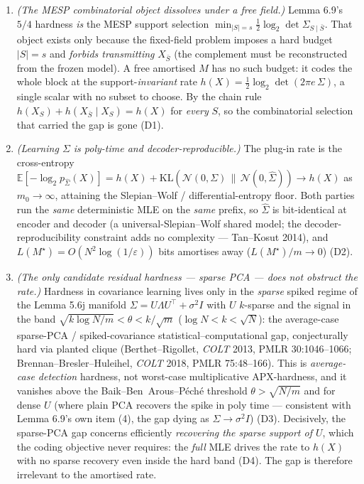 \documentclass[
]{article}
\begin{document}
\begin{enumerate}
\item \emph{(The MESP combinatorial object dissolves under a free field.)}
Lemma 6.9's $5/4$ hardness \emph{is} the MESP support selection
$\min_{|S|=s}\tfrac12\log_2\det\Sigma_{S\mid\bar S}$. That object exists only
because the fixed-field problem imposes a hard budget $|S|=s$ and \emph{forbids
transmitting} $X_{\bar S}$ (the complement must be reconstructed from the
frozen model). A free amortised $M$ has no such budget: it codes the whole
block at the support-\emph{invariant} rate $h(X)=\tfrac12\log_2\det(2\pi e\,
\Sigma)$, a single scalar with no subset to choose. By the chain rule
$h(X_S)+h(X_{\bar S}\mid X_S)=h(X)$ for \emph{every} $S$, so the
combinatorial selection that carried the gap is gone (D1).
\item \emph{(Learning $\Sigma$ is poly-time and decoder-reproducible.)}
The plug-in rate is the cross-entropy $\mathbb E[-\log_2 p_{\hat\Sigma}(X)]
=h(X)+\mathrm{KL}(\mathcal N(0,\Sigma)\,\|\,\mathcal N(0,\hat\Sigma))\to
h(X)$ as $m_0\to\infty$, attaining the Slepian--Wolf / differential-entropy
floor. Both parties run the \emph{same} deterministic MLE on the \emph{same}
prefix, so $\hat\Sigma$ is bit-identical at encoder and decoder (a
universal-Slepian--Wolf shared model; the decoder-reproducibility constraint
adds no complexity --- Tan--Kosut 2014), and $L(M^\star)=O(N^2\log(1/
\varepsilon))$ bits amortises away ($L(M^\star)/m\to0$) (D2).
\item \emph{(The only candidate residual hardness --- sparse PCA --- does not
obstruct the rate.)} Hardness in covariance learning lives only in the
\emph{sparse} spiked regime of the Lemma 5.6j manifold $\Sigma=U\Lambda
U^\top+\sigma^2I$ with $U$ $k$-sparse and the signal in the band
$\sqrt{k\log N/m}<\theta<k/\sqrt m$ ($\log N<k<\sqrt N$): the average-case
sparse-PCA / spiked-covariance statistical--computational gap, conjecturally
hard via planted clique (Berthet--Rigollet, \emph{COLT} 2013, PMLR 30:1046--1066;
Brennan--Bresler--Huleihel, \emph{COLT} 2018, PMLR 75:48--166). This is \emph{average-case detection}
hardness, not worst-case multiplicative APX-hardness, and it vanishes above
the Baik--Ben~Arous--P\'ech\'e threshold $\theta>\sqrt{N/m}$ and for dense $U$
(where plain PCA recovers the spike in poly time --- consistent with Lemma
6.9's own item (4), the gap dying as $\Sigma\to\sigma^2 I$) (D3).
Decisively, the sparse-PCA gap concerns efficiently \emph{recovering the
sparse support of $U$}, which the coding objective never requires: the
\emph{full} MLE drives the rate to $h(X)$ with no sparse recovery even inside
the hard band (D4). The gap is therefore irrelevant to the amortised rate.
\end{enumerate}
\end{document}
